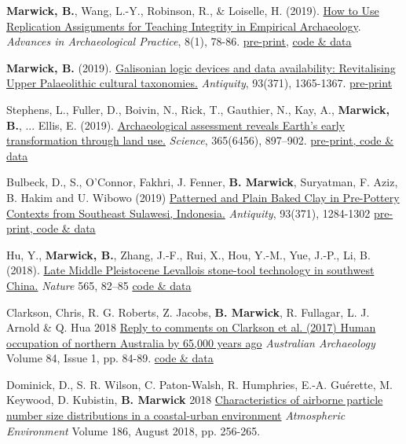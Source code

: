 \documentclass[11pt,article,oneside]{memoir}
\begin{document}
\ind \textbf{Marwick, B.}, Wang, L.-Y., Robinson, R., \& Loiselle, H. (2019). \href{https://doi.org/10.1017/aap.2019.38}{How to Use Replication Assignments for Teaching Integrity in Empirical Archaeology}. \textit{Advances in Archaeological Practice}, 8(1), 78-86. \href{https://osf.io/preprints/socarxiv/tsxbv/}{pre-print}, \href{https://doi.org/10.17605/OSF.IO/DBSW9}{code \& data}

\ind \textbf{Marwick, B.} (2019). \href{https://doi.org/10.15184/aqy.2019.131}{Galisonian logic devices and data availability: Revitalising Upper Palaeolithic cultural taxonomies.} \textit{Antiquity}, 93(371), 1365-1367. \href{https://osf.io/preprints/socarxiv/v8dej/}{pre-print}

\ind Stephens, L., Fuller, D., Boivin, N., Rick, T., Gauthier, N., Kay, A., \textbf{Marwick, B.}, ...  Ellis, E. (2019). \href{https://doi.org/10.1126/science.aax1192}{Archaeological assessment reveals Earth’s early transformation through land use.} \textit{Science}, 365(6456), 897–902. \href{https://dataverse.harvard.edu/dataverse/ArchaeoGLOBE}{pre-print, code \& data}

\ind Bulbeck, D., S., O’Connor, Fakhri, J. Fenner,  \textbf{B. Marwick}, Suryatman, F. Aziz, B. Hakim and U. Wibowo (2019) \href{https://doi.org/10.15184/aqy.2019.134}{Patterned and Plain Baked Clay in Pre-Pottery Contexts from Southeast Sulawesi, Indonesia.} \textit{Antiquity}, 93(371), 1284-1302 \href{https://osf.io/jn5tu/}{pre-print, code \& data}

\ind Hu, Y., \textbf{Marwick, B.}, Zhang, J.-F., Rui, X., Hou, Y.-M., Yue, J.-P., Li, B. (2018). \href{https://doi.org/10.1038/s41586-018-0710-1}{Late Middle Pleistocene Levallois stone-tool technology in southwest China.} \textit{Nature}  565, 82–85 \href{https://osf.io/erntj/}{code \& data}

\ind Clarkson, Chris, R. G. Roberts, Z. Jacobs, \textbf{B. Marwick}, R. Fullagar, L. J. Arnold \& Q. Hua 2018 \href{https://doi.org/10.1080/03122417.2018.1462884}{Reply to comments on Clarkson et al. (2017) Human occupation of northern Australia by 65,000 years ago} \textit{Australian Archaeology} Volume 84, Issue 1, pp. 84-89. \href{https://osf.io/qydc9/}{code \& data}

\ind Dominick, D., S. R. Wilson, C. Paton-Walsh, R. Humphries, E.-A. Guérette, M. Keywood, D. Kubistin, \textbf{B. Marwick} 2018 \href{http://doi.org/10.1016/j.atmosenv.2018.05.031}{Characteristics of airborne particle number size distributions in a coastal-urban environment}  \textit{Atmospheric Environment} Volume 186, August 2018, pp. 256-265.
\end{document}
